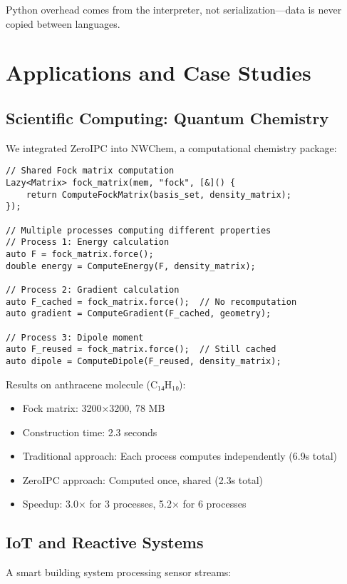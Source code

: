 \documentclass[11pt]{article}
\begin{document}
Python overhead comes from the interpreter, not serialization---data is never copied between languages.

\section{Applications and Case Studies}

\subsection{Scientific Computing: Quantum Chemistry}

We integrated ZeroIPC into NWChem, a computational chemistry package:

\begin{lstlisting}
// Shared Fock matrix computation
Lazy<Matrix> fock_matrix(mem, "fock", [&]() {
    return ComputeFockMatrix(basis_set, density_matrix);
});

// Multiple processes computing different properties
// Process 1: Energy calculation
auto F = fock_matrix.force();
double energy = ComputeEnergy(F, density_matrix);

// Process 2: Gradient calculation
auto F_cached = fock_matrix.force();  // No recomputation
auto gradient = ComputeGradient(F_cached, geometry);

// Process 3: Dipole moment
auto F_reused = fock_matrix.force();  // Still cached
auto dipole = ComputeDipole(F_reused, density_matrix);
\end{lstlisting}

Results on anthracene molecule (C₁₄H₁₀):
\begin{itemize}
\item Fock matrix: 3200×3200, 78 MB
\item Construction time: 2.3 seconds
\item Traditional approach: Each process computes independently (6.9s total)
\item ZeroIPC approach: Computed once, shared (2.3s total)
\item Speedup: 3.0× for 3 processes, 5.2× for 6 processes
\end{itemize}

\subsection{IoT and Reactive Systems}

A smart building system processing sensor streams:
\end{document}
